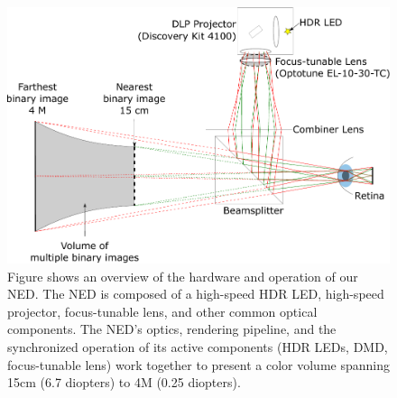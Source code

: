\begin{figure}
\centering
\includegraphics[width=0.99\columnwidth]{images/volumetric/proposedCandidate}
\caption[Volumetric NED: optics overview]{Figure shows an overview of the hardware and operation of our NED. The NED is composed of a high-speed HDR LED, high-speed projector, focus-tunable lens, and other common optical components. The NED's optics, rendering pipeline, and the synchronized operation of its active components (HDR LEDs, DMD, focus-tunable lens) work together to present a color volume spanning 15cm (6.7 diopters) to 4M (0.25 diopters).}
\label{fig:volumetric:proposedCandidate}
\end{figure}